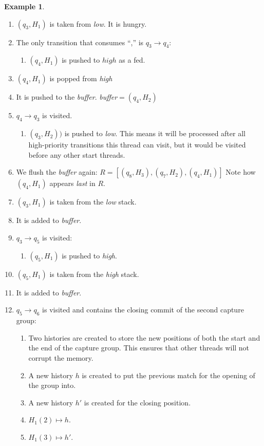 \documentclass[english]{sigplanconf}
\theoremstyle{definition}
\newtheorem{example}{Example}[section]
\begin{document}
\begin{example}
\begin{enumerate}
\item $(q_3, H_1)$ is taken from \emph{low}. It is hungry.
\item The only transition that consumes ``,'' is $q_3\rightarrow q_4$:\begin{enumerate}
	\item $(q_4, H_1)$ is pushed to $high$ as a fed.
\end{enumerate}
\item $(q_4, H_1)$ is popped from \emph{high}
\item It is pushed to the \emph{buffer}. \emph{buffer}$=(q_4, H_2)$
\item $q_4\rightarrow q_3$ is visited. \begin{enumerate}
	\item $(q_3, H_2))$ is pushed to \emph{low}. This means it will be processed after all high-priority 
	transitions this thread can visit, but it would be visited before any other start threads.
\end{enumerate}
\item We flush the \emph{buffer} again: $R=[(q_8, H_3), (q_7, H_2), (q_4, H_1)]$
	Note how $(q_4, H_1)$ appears \emph{last} in $R$.
\item $(q_3, H_1)$ is taken from the \emph{low} stack.
\item It is added to \emph{buffer}.
\item $q_3\rightarrow q_5$ is visited:\begin{enumerate}
	\item $(q_5, H_1)$ is pushed to \emph{high}.
\end{enumerate}
\item $(q_5, H_1)$ is taken from the \emph{high} stack.
\item It is added to \emph{buffer}.
\item $q_5\rightarrow q_6$ is visited and contains the closing commit of the second capture group:\begin{enumerate}
	\item Two histories are created to store the new positions of both the start and the end of the capture group. This ensures that other threads will not corrupt the memory.
	\item A new history $h$ is created to put the previous match for the opening of the group into.
	\item A new history $h'$ is created for the closing position.
	\item $H_1(2) \mapsto h$. 
	\item $H_1(3) \mapsto h'$.

\end{enumerate}
\end{enumerate}
\end{example}
\end{document}

